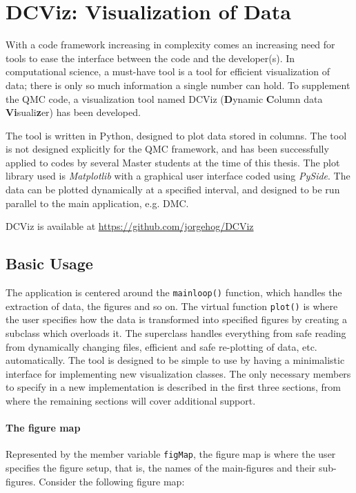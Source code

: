 \chapter{DCViz: Visualization of Data}

With a code framework increasing in complexity comes an increasing need for tools to ease the interface between the code and the developer(s). In computational science, a must-have tool is a tool for efficient visualization of data; there is only so much information a single number can hold. To supplement the QMC code, a visualization tool named DCViz (\textbf{D}ynamic \textbf{C}olumn data \textbf{Vi}suali\textbf{z}er) has been developed.

The tool is written in Python, designed to plot data stored in columns. The tool is not designed explicitly for the QMC framework, and has been successfully applied to codes by several Master students at the time of this thesis. The plot library used is \textit{Matplotlib}\cite{Matplotlib} with a graphical user interface coded using \textit{PySide}\cite{Pyside}. The data can be plotted dynamically at a specified interval, and designed to be run parallel to the main application, e.g. DMC.

DCViz is available at \url{https://github.com/jorgehog/DCViz}

\section{Basic Usage}

The application is centered around the \verb+mainloop()+ function, which handles the extraction of data, the figures and so on. The virtual function \verb+plot()+ is where the user specifies how the data is transformed into specified figures by creating a subclass which overloads it. The superclass handles everything from safe reading from dynamically changing files, efficient and safe re-plotting of data, etc. automatically. The tool is designed to be simple to use by having a minimalistic interface for implementing new visualization classes. The only necessary members to specify in a new implementation is described in the first three sections, from where the remaining sections will cover additional support. 

\subsubsection{The figure map}

Represented by the member variable \verb+figMap+, the figure map is where the user specifies the figure setup, that is, the names of the main-figures and their sub-figures. Consider the following figure map:  

